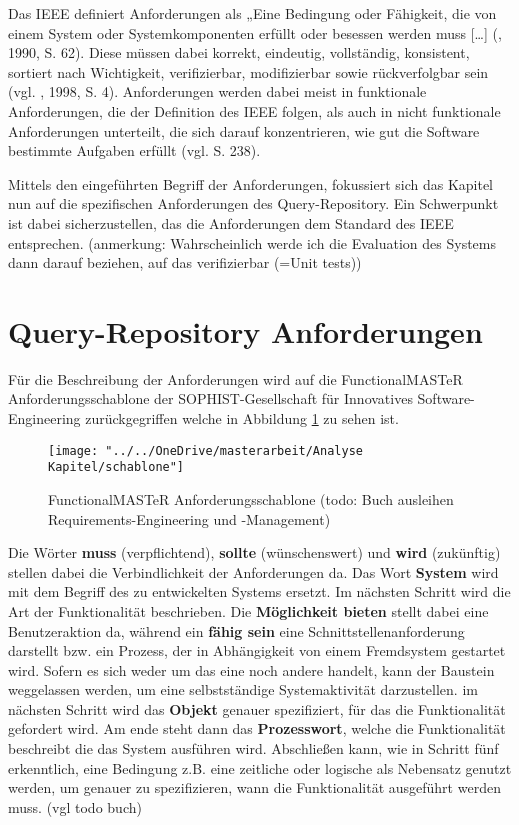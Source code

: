 Das IEEE definiert Anforderungen als „Eine Bedingung oder Fähigkeit, die von einem System oder Systemkomponenten erfüllt oder besessen werden muss [\dots] (\cite{requierements}, 1990, S. 62). Diese müssen dabei korrekt, eindeutig, vollständig, konsistent, sortiert nach Wichtigkeit, verifizierbar, modifizierbar sowie rückverfolgbar sein (vgl. \cite{requierements_char}, 1998, S. 4). 
Anforderungen werden dabei meist in funktionale Anforderungen, die der Definition des IEEE folgen, als auch in nicht funktionale Anforderungen unterteilt, die sich darauf konzentrieren, wie gut die Software bestimmte Aufgaben erfüllt (vgl. \cite{nonfunctional} S. 238).

Mittels den eingeführten Begriff der Anforderungen, fokussiert sich das Kapitel nun auf die spezifischen Anforderungen des Query-Repository. Ein Schwerpunkt ist dabei sicherzustellen, das die Anforderungen dem Standard des IEEE entsprechen.
(anmerkung: Wahrscheinlich werde ich die Evaluation des Systems dann darauf beziehen, auf das verifizierbar (=Unit tests))



\section{Query-Repository Anforderungen}
Für die Beschreibung der Anforderungen wird auf die FunctionalMASTeR Anforderungsschablone der SOPHIST-Gesellschaft für Innovatives Software-Engineering zurückgegriffen welche in Abbildung \ref{fig:schablone} zu sehen ist.
\begin{figure}[h!]
	\centering
	\texttt{[image: "../../OneDrive/masterarbeit/Analyse Kapitel/schablone"]}
	\caption{ FunctionalMASTeR Anforderungsschablone (todo: Buch ausleihen Requirements-Engineering und -Management)}
	\label{fig:schablone}
\end{figure}
\newline
Die Wörter \textbf{muss} (verpflichtend), \textbf{sollte} (wünschenswert) und \textbf{wird} (zukünftig) stellen dabei die Verbindlichkeit der Anforderungen da. 
Das Wort \textbf{System} wird mit dem Begriff des zu entwickelten Systems ersetzt.
Im nächsten Schritt wird die Art der Funktionalität beschrieben. Die \textbf{Möglichkeit bieten} stellt dabei eine Benutzeraktion da, während ein \textbf{fähig sein} eine Schnittstellenanforderung darstellt bzw. ein Prozess, der in Abhängigkeit von einem Fremdsystem gestartet wird. Sofern es sich weder um das eine noch andere handelt, kann der Baustein weggelassen werden, um eine selbstständige Systemaktivität darzustellen. im nächsten Schritt wird das \textbf{Objekt} genauer spezifiziert, für das die Funktionalität gefordert wird. Am ende steht dann das \textbf{Prozesswort}, welche die Funktionalität beschreibt die das System ausführen wird. 
Abschließen kann, wie in Schritt fünf erkenntlich, eine Bedingung z.B. eine zeitliche oder logische als Nebensatz genutzt werden, um genauer zu spezifizieren, wann die Funktionalität ausgeführt werden muss. (vgl todo buch) 

